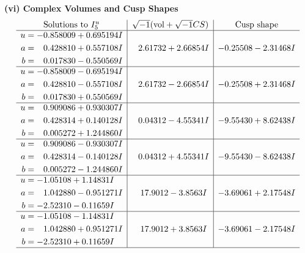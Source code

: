 \documentclass[1p]{elsarticle_modified}
\theoremstyle{definition}
\newcommand{\I}{\sqrt{-1}}
\begin{document}
\newpage\flushleft \textbf{(vi) Complex Volumes and Cusp Shapes}
$$\begin{array}{c|c|c}  
\text{Solutions to }I^u_{5}& \I (\text{vol} + \sqrt{-1}CS) & \text{Cusp shape}\\
 \hline 
\begin{aligned}
u &= -0.858009 + 0.695194 I \\
a &= \phantom{-}0.428810 + 0.557108 I \\
b &= \phantom{-}0.017830 - 0.550569 I\end{aligned}
 & \phantom{-}2.61732 + 2.66854 I & -0.25508 - 2.31468 I \\ \hline\begin{aligned}
u &= -0.858009 - 0.695194 I \\
a &= \phantom{-}0.428810 - 0.557108 I \\
b &= \phantom{-}0.017830 + 0.550569 I\end{aligned}
 & \phantom{-}2.61732 - 2.66854 I & -0.25508 + 2.31468 I \\ \hline\begin{aligned}
u &= \phantom{-}0.909086 + 0.930307 I \\
a &= \phantom{-}0.428314 + 0.140128 I \\
b &= \phantom{-}0.005272 + 1.244860 I\end{aligned}
 & \phantom{-}0.04312 - 4.55341 I & -9.55430 + 8.62438 I \\ \hline\begin{aligned}
u &= \phantom{-}0.909086 - 0.930307 I \\
a &= \phantom{-}0.428314 - 0.140128 I \\
b &= \phantom{-}0.005272 - 1.244860 I\end{aligned}
 & \phantom{-}0.04312 + 4.55341 I & -9.55430 - 8.62438 I \\ \hline\begin{aligned}
u &= -1.05108 + 1.14831 I \\
a &= \phantom{-}1.042880 - 0.951271 I \\
b &= -2.52310 - 0.11659 I\end{aligned}
 & \phantom{-}17.9012 - 3.8563 I & -3.69061 + 2.17548 I \\ \hline\begin{aligned}
u &= -1.05108 - 1.14831 I \\
a &= \phantom{-}1.042880 + 0.951271 I \\
b &= -2.52310 + 0.11659 I\end{aligned}
 & \phantom{-}17.9012 + 3.8563 I & -3.69061 - 2.17548 I\\
 \hline 
 \end{array}$$\newpage\newpage\renewcommand{\arraystretch}{1}
\end{document}
